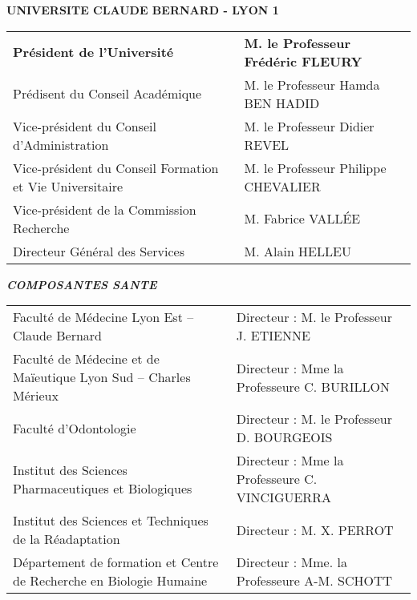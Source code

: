 \newpage\thispagestyle{empty}
\null
\newpage
\thispagestyle{empty}
\begin{minipage}{0.95\textwidth}
\begin{center}
\begin{large}\textbf{UNIVERSITE CLAUDE BERNARD - LYON 1}\end{large}
\vspace{0.8cm}

\begin{footnotesize}
\begin{tabular}{p{8cm}p{6.75cm}}
\textbf{Président de l'Université} & \textbf{M. le Professeur Frédéric FLEURY} \\
Prédisent du Conseil Académique & M. le Professeur Hamda BEN HADID\\
Vice-président  du Conseil d'Administration & M. le Professeur Didier REVEL\\
Vice-président du Conseil Formation et Vie Universitaire & M. le Professeur Philippe CHEVALIER\\
Vice-président de la Commission Recherche & M. Fabrice VALLÉE\\
Directeur Général des Services & M. Alain HELLEU\\
\end{tabular}
\end{footnotesize}
\end{center}
\end{minipage}
\vfill
\begin{minipage}{0.95\textwidth}
\begin{center}
\vspace{0.5cm}
\textit{\textbf{COMPOSANTES SANTE}}
\vspace{0.2cm}
\begin{footnotesize}
\begin{tabular}{p{8cm}p{6.75cm}}
Faculté de Médecine Lyon Est – Claude Bernard & Directeur : M. le Professeur J. ETIENNE\\
Faculté de Médecine et de Maïeutique Lyon Sud – Charles Mérieux & Directeur : Mme la Professeure C. BURILLON\\
Faculté d’Odontologie  & Directeur : M. le Professeur D. BOURGEOIS\\
Institut des Sciences Pharmaceutiques et Biologiques & Directeur : Mme la Professeure C. VINCIGUERRA\\
Institut des Sciences et Techniques de la Réadaptation & Directeur : M. X. PERROT\\
Département de formation et Centre de Recherche en Biologie Humaine & Directeur : Mme. la Professeure A-M. SCHOTT\\
\end{tabular}
\end{footnotesize}
\end{center}
\end{minipage}
